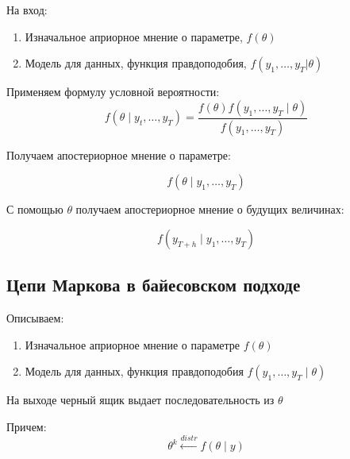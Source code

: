 \documentclass[a4paper, 12pt]{article}
\begin{document}
На вход:
\begin{enumerate}
    \item Изначальное априорное мнение о параметре, $f(\theta)$
    \item Модель для данных, функция правдоподобия, $f(y_{1}, \ldots, y_{T}|\theta)$
\end{enumerate}

Применяем формулу условной вероятности:
\[f(\theta \mid y_{t}, \ldots, y_{T}) = \frac{f(\theta)f(y_{1}, \ldots, y_{T} \mid \theta)}{f(y_{1}, \ldots, y_{T})}\]

Получаем апостериорное мнение о параметре:

\[f(\theta \mid y_{1}, \ldots, y_{T})\]

С помощью $\theta$ получаем апостериорное мнение о будущих величинах:

\[f(y_{T + h} \mid y_{1}, \ldots, y_{T})\]

\subsection{Цепи Маркова в байесовском подходе}

Описываем:

\begin{enumerate}
    \item Изначальное априорное мнение о параметре $f(\theta)$
    \item Модель для данных, функция правдоподобия $f(y_{1}, \ldots, y_{T} \mid \theta)$
\end{enumerate}

На выходе черный ящик выдает последовательность из $\theta$

Причем: 
\[\theta^{k} \xleftarrow[]{distr} f(\theta \mid y)\]
\end{document}
